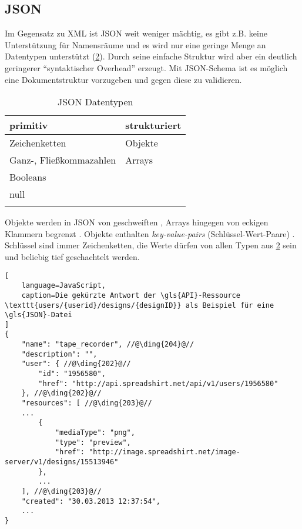 \subsection{JSON}
\label{sec:json}


Im Gegensatz zu \gls{XML} ist \gls{JSON} weit weniger mächtig, es gibt z.B. keine Unterstützung für Namensräume und es wird nur eine geringe Menge an Datentypen unterstützt (\cref{tab:jsonDatatypes}). 
Durch seine einfache Struktur wird aber ein deutlich geringerer \enquote{syntaktischer Overhead} erzeugt.
Mit \gls{JSON}-Schema \cite{json-schema-draft} ist es möglich eine Dokumentstruktur vorzugeben und gegen diese zu validieren. 

\begin{table}[tb]
    \begin{longtable}[c]{l l}
        \toprule
        \rowcolor{lightgray}
        \textbf{primitiv}   & \textbf{strukturiert}\\
        \midrule
        Zeichenketten       & Objekte\\
        Ganz-, 
        Fließkommazahlen    & Arrays\\
        Booleans            & \\
        null                & \\
        \bottomrule
        \caption{\gls{JSON} Datentypen}
        \label{tab:jsonDatatypes}
    \end{longtable}
\end{table}

Objekte werden in \gls{JSON} von geschweiften , Arrays hingegen von eckigen Klammern begrenzt . 
Objekte enthalten \emph{key-value-pairs} (Schlüssel-Wert-Paare) . Schlüssel sind immer Zeichenketten, die Werte dürfen von allen Typen aus \cref{tab:jsonDatatypes} sein und beliebig tief geschachtelt werden.
%
%
\begin{minipage}{\textwidth}
\begin{lstlisting}[
    language=JavaScript,
    caption=Die gekürzte Antwort der \gls{API}-Ressource \texttt{users/{userid}/designs/{designID}} als Beispiel für eine \gls{JSON}-Datei
]
{
    "name": "tape_recorder", //@\ding{204}@//
    "description": "",
    "user": { //@\ding{202}@//
        "id": "1956580",
        "href": "http://api.spreadshirt.net/api/v1/users/1956580"
    }, //@\ding{202}@//
    "resources": [ //@\ding{203}@//
    ...
        {
            "mediaType": "png",
            "type": "preview",
            "href": "http://image.spreadshirt.net/image-server/v1/designs/15513946"
        }, 
        ...
    ], //@\ding{203}@//
    "created": "30.03.2013 12:37:54",
    ...
}
\end{lstlisting}    
\end{minipage}
